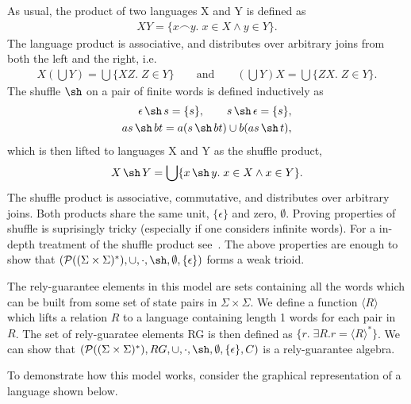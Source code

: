 \documentclass{llncs}
\DeclareMathOperator{\sha}{\sh}
\begin{document}
As usual, the product of two languages X and Y is defined as
\begin{align*}
XY = \{x\frown y.\; x \in X \land y \in Y\}.
\end{align*}
The language product is associative, and distributes over arbitrary
joins from both the left and the right, i.e.
\begin{align*}
X(\bigcup Y) = \bigcup\{XZ.\; Z \in Y\} \qquad \text{and} \qquad (\bigcup Y)X = \bigcup\{ZX.\; Z \in Y\}.
\end{align*}
The shuffle $\sha$ on a pair
of finite words is defined inductively as
\begin{align*}
\epsilon \sha s = \{s\}, \qquad s \sha \epsilon = \{s\},\\
as \sha bt = a(s \sha bt) \cup b(as \sha t),
\end{align*}
which is then lifted to languages X and Y as the shuffle product,
\begin{align*}
X \sha Y = \bigcup\{x \sha y.\; x \in X \land x \in Y\}.
\end{align*}
The shuffle product is associative, commutative, and distributes over
arbitrary joins. Both products share the same unit, $\{\epsilon\}$ and
zero, $\emptyset$. Proving properties of shuffle is suprisingly
tricky (especially if one considers infinite words). For a in-depth
treatment of the shuffle product see~\cite{shufflethings}. The
above properties are enough to show that $(\mathcal{P}((\Sigma\times\Sigma)^*),
\cup, \cdot,\sha, \emptyset, \{\epsilon\})$ forms a weak trioid.

The rely-guarantee elements in this model are sets containing all the
words which can be built from some set of state pairs in
$\Sigma\times\Sigma$. We define a function $\langle R\rangle$ which
lifts a relation $R$ to a language containing length 1 words for each
pair in $R$. The set of rely-guaratee elements RG is then defined as
$\{r.\; \exists R. r = \langle R\rangle^*\}$. We can show that
$(\mathcal{P}((\Sigma\times\Sigma)^*), RG, \cup, \cdot,\sha,
\emptyset, \{\epsilon\}, C)$ is a rely-guarantee algebra.

To demonstrate how this model works, consider the graphical
representation of a language shown below.
\end{document}
